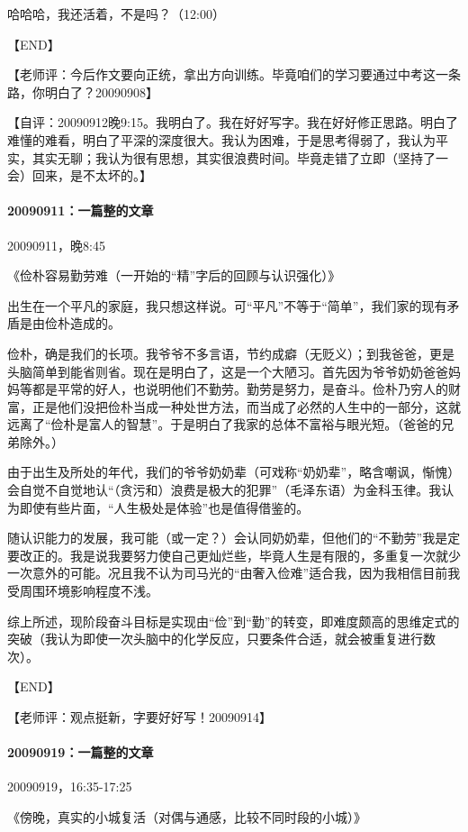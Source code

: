 \documentclass[UTF8]{Diaries}
\begin{document}
哈哈哈，我还活着，不是吗？（12:00）

【END】

【老师评：今后作文要向正统，拿出方向训练。毕竟咱们的学习要通过中考这一条路，你明白了？20090908】

【自评：20090912晚9:15。我明白了。我在好好写字。我在好好修正思路。明白了难懂的难看，明白了平深的深度很大。我认为困难，于是思考得弱了，我认为平实，其实无聊；我认为很有思想，其实很浪费时间。毕竟走错了立即（坚持了一会）回来，是不太坏的。】


\paragraph{20090911：一篇整的文章}
20090911，晚8:45

《俭朴容易勤劳难（一开始的“精”字后的回顾与认识强化）》

出生在一个平凡的家庭，我只想这样说。可“平凡”不等于“简单”，我们家的现有矛盾是由俭朴造成的。

俭朴，确是我们的长项。我爷爷不多言语，节约成癖（无贬义）；到我爸爸，更是头脑简单到能省则省。现在是明白了，这是一个大陋习。首先因为爷爷奶奶爸爸妈妈等都是平常的好人，也说明他们不勤劳。勤劳是努力，是奋斗。俭朴乃穷人的财富，正是他们没把俭朴当成一种处世方法，而当成了必然的人生中的一部分，这就远离了“俭朴是富人的智慧”。于是明白了我家的总体不富裕与眼光短。（爸爸的兄弟除外。）

由于出生及所处的年代，我们的爷爷奶奶辈（可戏称“奶奶辈”，略含嘲讽，惭愧）会自觉不自觉地认“（贪污和）浪费是极大的犯罪”（毛泽东语）为金科玉律。我认为即使有些片面，“人生极处是体验”也是值得借鉴的。

随认识能力的发展，我可能（或一定？）会认同奶奶辈，但他们的“不勤劳”我是定要改正的。我是说我要努力使自己更灿烂些，毕竟人生是有限的，多重复一次就少一次意外的可能。况且我不认为司马光的“由奢入俭难”适合我，因为我相信目前我受周围环境影响程度不浅。

综上所述，现阶段奋斗目标是实现由“俭”到“勤”的转变，即难度颇高的思维定式的突破（我认为即使一次头脑中的化学反应，只要条件合适，就会被重复进行数次）。

【END】

【老师评：观点挺新，字要好好写！20090914】


\paragraph{20090919：一篇整的文章}

20090919，16:35-17:25

《傍晚，真实的小城复活（对偶与通感，比较不同时段的小城）》
\end{document}

